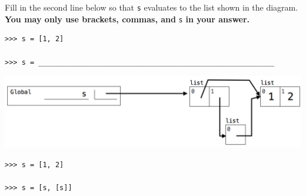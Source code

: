
\question Fill in the second line below so that {\tt s} evaluates to the list shown in the
diagram. {\bf You may only use brackets, commas, and} {\tt s} {\bf in your
answer.}

\begin{lstlisting}
>>> s = [1, 2]

>>> s = ________________________________________________________
\end{lstlisting}

\begin{center}
\includegraphics[scale=.5]{s-list.png}
\end{center}

\begin{solution}[0.5in]
\begin{lstlisting}
>>> s = [1, 2]

>>> s = [s, [s]]
\end{lstlisting}
\end{solution}